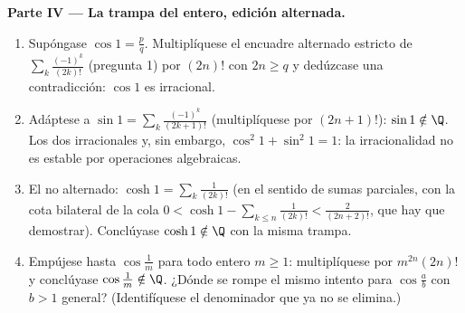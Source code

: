 \begin{problem}
\medskip
\noindent\textbf{Parte IV --- La trampa del entero, edición
alternada.}
\begin{enumerate}[resume]
  \item Supóngase $\cos 1 = \frac pq$. Multiplíquese el encuadre
        alternado estricto de $\sum_{k} \frac{(-1)^k}{(2k)!}$
        (pregunta 1) por $(2n)!$ con $2n \geq q$ y dedúzcase una
        contradicción: $\cos 1$ es irracional.
  \item Adáptese a $\sin 1 = \sum_k \frac{(-1)^k}{(2k+1)!}$
        (multiplíquese por $(2n+1)!$): $\sin 1 \notin \Q$. Los dos
        irracionales y, sin embargo, $\cos^2 1 + \sin^2 1 = 1$: la
        irracionalidad no es estable por operaciones algebraicas.
  \item El  no alternado: $\cosh 1 = \sum_k \frac{1}{(2k)!}$
        (en el sentido de sumas parciales, con la cota bilateral de
        la cola $0 < \cosh 1 - \sum_{k \leq n} \frac{1}{(2k)!} <
        \frac{2}{(2n+2)!}$, que hay que demostrar). Conclúyase
        $\cosh 1 \notin \Q$ con la misma trampa.
  \item Empújese hasta $\cos\frac 1m$ para todo entero $m \geq 1$:
        multiplíquese por $m^{2n}(2n)!$ y conclúyase
        $\cos\frac1m \notin \Q$. ¿Dónde se rompe el mismo intento
        para $\cos\frac ab$ con $b > 1$ general? (Identifíquese el
        denominador que ya no se elimina.)
\end{enumerate}


\end{problem}
